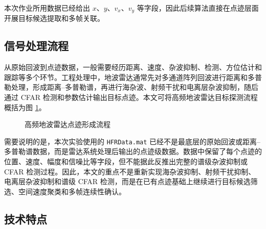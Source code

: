 \documentclass[UTF8,a4paper,12pt]{ctexart}
\numberwithin{figure}{section}
\numberwithin{table}{section}
\begin{document}
本次作业所用数据已经给出 \(x\)、\(y\)、\(v_x\)、\(v_y\) 等字段，因此后续算法直接在点迹层面开展目标候选提取和多帧关联。

\subsection{信号处理流程}

从原始回波到点迹数据，一般需要经历距离、速度、杂波抑制、检测、方位估计和跟踪等多个环节。工程处理中，地波雷达通常先对多通道阵列回波进行距离和多普勒处理，形成距离--多普勒谱，再进行海杂波、射频干扰和电离层杂波抑制，随后通过 CFAR 检测和参数估计输出目标点迹。本文可将高频地波雷达目标探测流程概括为图 \ref{fig:radar_pipeline}。

\begin{figure}[H]
  \centering
  \caption{高频地波雷达点迹形成流程}
  \label{fig:radar_pipeline}
\end{figure}

需要说明的是，本次实验使用的 \texttt{HFRData.mat} 已经不是最底层的原始回波或距离--多普勒谱数据，而是雷达系统处理后输出的点迹级数据。数据中保留了每个点迹的位置、速度、幅度和信噪比等字段，但不能据此反推出完整的谱级杂波抑制或 CFAR 检测过程。因此，本文的重点不是重新实现海杂波抑制、射频干扰抑制、电离层杂波抑制和谱级 CFAR 检测，而是在已有点迹基础上继续进行目标候选筛选、空间速度聚类和多帧连续性确认。

\subsection{技术特点}
\end{document}
